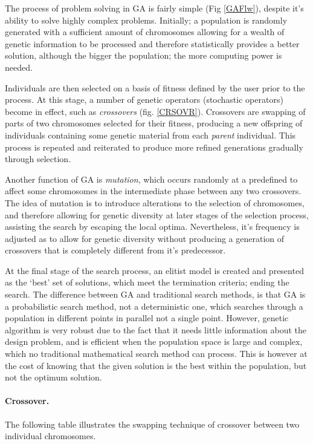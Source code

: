 The process of problem solving in GA is fairly simple (Fig \ref{GAFlw}), despite it's ability to solve highly complex problems. Initially; a population is randomly generated with a sufficient amount of chromosomes allowing for a wealth of genetic information to be processed and therefore statistically provides a better solution, although the bigger the population; the more computing power is needed. 

Individuals are then selected on a basis of fitness defined by the user prior to the process. At this stage, a number of genetic operators (stochastic operators) become in effect, such as \emph{crossovers} (fig. \ref{CRSOVR}). Crossovers are swapping of parts of two chromosomes selected for their fitness, producing a new offspring of individuals containing some genetic material from each \emph{parent} individual. This process is repeated and reiterated to produce more refined generations gradually through selection.

Another function of GA is \emph{mutation}, which occurs randomly at a predefined to affect some chromosomes in the intermediate phase between any two crossovers. The idea of mutation is to introduce alterations to the selection of chromosomes, and therefore allowing for genetic diversity at later stages of the selection process, assisting the search by escaping the local optima. Nevertheless, it's frequency is adjusted as to allow for genetic diversity without producing a generation of crossovers that is completely different from it's predecessor.

At the final stage of the search process, an elitist model is created and presented as the `best' set of solutions, which meet the termination criteria; ending the search. The difference between GA and traditional  search methods, is that GA is a probabilistic search method, not a deterministic one, which searches through a population in different points in parallel not a single point. However, genetic algorithm is very robust due to the fact that it needs little information about the design problem, and is efficient when the population space is large and complex, which no traditional mathematical search method can process. This is however at the cost of knowing that the given solution is the best within the population, but not the optimum solution.

\paragraph{Crossover.} The following table illustrates the swapping technique of crossover between two individual chromosomes.

